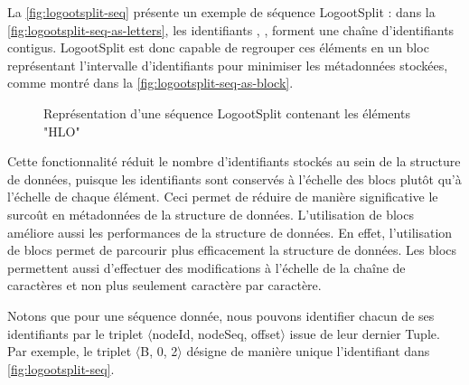 La \autoref{fig:logootsplit-seq} présente un exemple de séquence LogootSplit : dans la \autoref{fig:logootsplit-seq-as-letters}, les identifiants , ,  forment une chaîne d'identifiants contigus.
LogootSplit est donc capable de regrouper ces éléments en un bloc représentant l'intervalle d'identifiants  pour minimiser les métadonnées stockées, comme montré dans la \autoref{fig:logootsplit-seq-as-block}.

\begin{figure}[!ht]
  \centering
  \hfil
  \caption{Représentation d'une séquence LogootSplit contenant les éléments "HLO"}
  \label{fig:logootsplit-seq}
\end{figure}

Cette fonctionnalité réduit le nombre d'identifiants stockés au sein de la structure de données, puisque les identifiants sont conservés à l'échelle des blocs plutôt qu'à l'échelle de chaque élément.
Ceci permet de réduire de manière significative le surcoût en métadonnées de la structure de données.
L'utilisation de blocs améliore aussi les performances de la structure de données.
En effet, l'utilisation de blocs permet de parcourir plus efficacement la structure de données.
Les blocs permettent aussi d'effectuer des modifications à l'échelle de la chaîne de caractères et non plus seulement caractère par caractère.


Notons que pour une séquence donnée, nous pouvons identifier chacun de ses identifiants par le triplet $\langle$nodeId, nodeSeq, offset$\rangle$ issue de leur dernier Tuple.
Par exemple, le triplet $\langle$B, 0, 2$\rangle$ désigne de manière unique l'identifiant  dans \autoref{fig:logootsplit-seq}.
